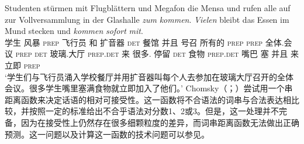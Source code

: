 \ea
\gll Studenten stürmen mit Flugblättern und Megafon die Mensa und rufen alle auf zur Vollversammlung in der Glashalle \emph{zum} \emph{kommen}. \emph{Vielen} bleibt das Essen im Mund stecken und \emph{kommen} \emph{sofort} \emph{mit}.\footnotemark\\
学生 风暴 \textsc{prep} 飞行员 和 扩音器 \textsc{det} 餐馆 并且 号召 所有的 \textsc{prep} \textsc{prep} 全体.会议 \textsc{prep} \textsc{det} 玻璃.大厅 \textsc{prep}.\textsc{det} 来 很多.\dat{} 停留 \textsc{det} 食物 \textsc{prep}.\textsc{det} 嘴巴 塞 并且 来 立即 \textsc{prep}\\
\glt `学生们与飞行员涌入学校餐厅并用扩音器叫每个人去参加在玻璃大厅召开的全体会议。很多学生嘴里塞满食物就立即加入了他们。'
\z
Chomsky（\citeyear[\S~5]{Chomsky75a}；\citeyear{Chomsky64a}）尝试用一个串距离函数来决定话语的相对可接受性。这一函数将不合语法的词串与合法表达相比较，并按照一定的标准给出不合乎语法对分数1、2或3。但是，这一处理并不完备，因为在接受性上仍然存在很多细颗粒度的差异，而词串距离函数无法做出正确预测。这一问题以及计算这一函数的技术问题可以参见。

